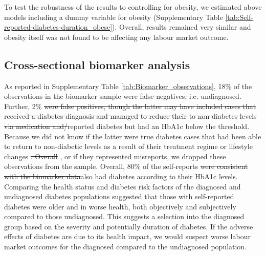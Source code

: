\documentclass[12pt,english]{article}
\providecommand{\DIFaddtex}[1]{{\protect\color{blue}#1}} %
\providecommand{\DIFdeltex}[1]{{\protect\color{red}\sout{#1}}}                      %
\providecommand{\DIFaddbegin}{} %
\providecommand{\DIFaddend}{} %
\providecommand{\DIFdelbegin}{} %
\providecommand{\DIFdelend}{} %
\providecommand{\DIFadd}[1]{\texorpdfstring{\DIFaddtex{#1}}{#1}} %
\providecommand{\DIFdel}[1]{\texorpdfstring{\DIFdeltex{#1}}{}} %
\begin{document}
\DIFaddbegin \DIFadd{To test the robustness of the results to controlling for obesity, we estimated above models including a dummy variable for obesity (Supplementary Table \ref{tab:Self-reported-diabetes-duration_obese}). Overall, results remained very similar and obesity itself was not found to be affecting any labour market outcome.
}



\DIFaddend \FloatBarrier

\subsection{Cross-sectional biomarker analysis}


As reported in Supplementary Table \ref{tab:Biomarker_observations}, 18\% of the observations in the biomarker sample were \DIFdelbegin \DIFdel{false negatives, i.e. }\DIFdelend undiagnosed. Further, 2\% \DIFdelbegin \DIFdel{were false positives, though the latter may have included cases that received a diabetes diagnosis and managed to reduce their }%
\DIFdel{to non-diabetes levels via medication and/}\DIFdelend \DIFaddbegin \DIFadd{reported diabetes but had an HbA1c below the threshold. Because we did not know if the latter were true diabetes cases that had been able to return to non-diabetic levels as a result of their treatment regime }\DIFaddend or lifestyle changes \parencite{Flores-Hernandez2015}\DIFdelbegin \DIFdel{. Overall }\DIFdelend \DIFaddbegin \DIFadd{, or if they represented misreports, we dropped these observations from the sample. Overall, }\DIFaddend 80\% of the self-reports \DIFdelbegin \DIFdel{were consistent with the biomarker data}\DIFdelend \DIFaddbegin \DIFadd{also had diabetes according to their HbA1c levels}\DIFaddend . Comparing the health status and diabetes risk factors of the diagnosed and undiagnosed diabetes populations suggested that those with self-reported diabetes were older and in worse health, both objectively and subjectively compared to those undiagnosed. This suggests a selection into the diagnosed group based on the severity and potentially duration of diabetes. If the adverse effects of diabetes are due to its health impact, we would suspect worse labour market outcomes for the diagnosed compared to the undiagnosed population.
\end{document}
